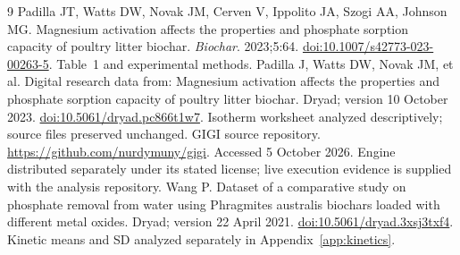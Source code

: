 \documentclass[11pt,letterpaper]{article}
\begin{document}
\begin{thebibliography}{9}
 Padilla JT, Watts DW, Novak JM, Cerven V, Ippolito JA, Szogi AA, Johnson MG. Magnesium activation affects the properties and phosphate sorption capacity of poultry litter biochar. \emph{Biochar}. 2023;5:64. \href{https://doi.org/10.1007/s42773-023-00263-5}{doi:10.1007/s42773-023-00263-5}. Table~1 and experimental methods.
 Padilla J, Watts DW, Novak JM, et al. Digital research data from: Magnesium activation affects the properties and phosphate sorption capacity of poultry litter biochar. Dryad; version 10 October 2023. \href{https://doi.org/10.5061/dryad.pc866t1w7}{doi:10.5061/dryad.pc866t1w7}. Isotherm worksheet analyzed descriptively; source files preserved unchanged.
 GIGI source repository. \url{https://github.com/nurdymuny/gigi}. Accessed 5 October 2026. Engine distributed separately under its stated license; live execution evidence is supplied with the analysis repository.
 Wang P. Dataset of a comparative study on phosphate removal from water using Phragmites australis biochars loaded with different metal oxides. Dryad; version 22 April 2021. \href{https://doi.org/10.5061/dryad.3xsj3txf4}{doi:10.5061/dryad.3xsj3txf4}. Kinetic means and SD analyzed separately in Appendix~\ref{app:kinetics}.
\end{thebibliography}

\clearpage
\appendix
\end{document}

